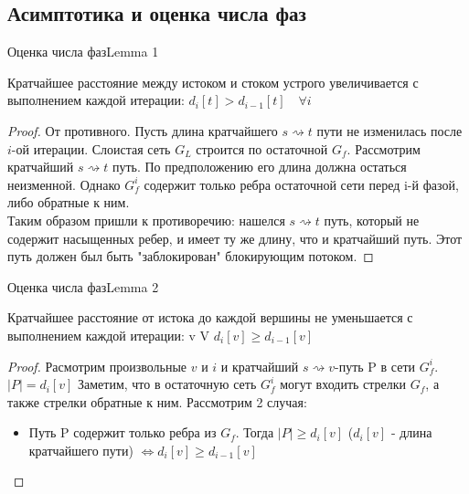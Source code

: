 \documentclass{beamer}
\begin{document}
\subsection{Асимптотика и оценка числа фаз}

\begin{frame}{Оценка числа фаз}{Lemma 1}
\begin{lemma}
        Кратчайшее расстояние между истоком и стоком устрого увеличивается с выполнением каждой итерации:
        \texttt{$d_{i}[t] > d_{i-1}[t] \quad \forall i$}
    \end{lemma}
    
    \begin{proof}
        От противного. Пусть длина кратчайшего $s \rightsquigarrow t$ пути не изменилась после $i$-ой итерации.
        Слоистая сеть $G_{L}$ строится по остаточной $G_{f}$. Рассмотрим кратчайший $s \rightsquigarrow t$ путь. По предположению его длина должна остаться неизменной. Однако $G^{i}_{f}$ содержит только ребра остаточной сети перед i-й фазой, либо обратные к ним. \\
        \pause
        Таким образом пришли к противоречию: нашелся $s \rightsquigarrow t$ путь, который не содержит насыщенных ребер, и имеет ту же длину, что и кратчайший путь. Этот путь должен был быть "заблокирован" блокирующим потоком.
    \end{proof}
\end{frame}

\begin{frame}{Оценка числа фаз}{Lemma 2}
    \begin{lemma}
        Кратчайшее расстояние от истока до каждой вершины не уменьшается с выполнением каждой итерации:
        \forall v \in V \quad \texttt{$d_{i}[v] \geq d_{i-1}[v] $}
    \end{lemma}
    \begin{proof}
        Расмотрим произвольные $v$ и $i$ и кратчайший $s \rightsquigarrow v$-путь P в сети $G^{i}_{f}$.
        $|P| = d_{i}[v]$
        Заметим, что в остаточную сеть $G^{i}_{f}$ могут входить стрелки $G_{f}$, а также стрелки обратные к ним.
        \pause
        Рассмотрим 2 случая:
        \pause
        \begin{itemize}
            \item Путь P содержит только ребра из $G_f$. Тогда $|P| \geq d_{i}[v]$ ($d_i[v]$ - длина кратчайшего пути) $\Longleftrightarrow d_i[v] \geq d_{i-1}[v]$
        \end{itemize}
    \end{proof}
\end{frame}
\end{document}
